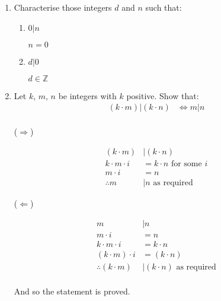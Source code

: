 \documentclass[10pt,\jkfside,a4paper]{article}
\begin{document}
\begin{enumerate}

\item Characterise those integers $d$ and $n$ such that:

\begin{enumerate}

\item $0|n$

$n = 0$

\item $d|0$

$d \in \mathbb{Z}$

\end{enumerate}

\item Let $k$, $m$, $n$ be integers with $k$ positive. Show that:
\begin{equation}
\begin{split}
(k\cdot m)|(k\cdot n) &\Longleftrightarrow m|n\\
\end{split}
\end{equation}

\begin{center}

($\Longrightarrow$)

\begin{equation}
\begin{split}
(k\cdot m)&|(k\cdot n)\\
k\cdot m \cdot i &= k\cdot n \text{ for some $i$}\\
m \cdot i &= n\\
\therefore m &| n \text{ as required}
\end{split}
\end{equation}

($\Longleftarrow$)

\begin{equation}
\begin{split}
m&|n\\
m\cdot i &= n\\
k\cdot m\cdot i &= k\cdot n\\
(k\cdot m) \cdot i &= (k\cdot n)\\
\therefore (k\cdot m)&|(k\cdot n)\text{ as required}\\
\end{split}
\end{equation}

And so the statement is proved.
\end{center}


\end{enumerate}
\end{document}
